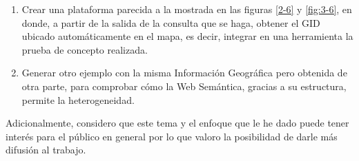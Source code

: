 \begin{enumerate}
	
	\item Crear una plataforma parecida a la mostrada en las figuras \ref{2-6} y \ref{fig:3-6}, en donde, a partir de la salida de la consulta que se haga, obtener el GID ubicado automáticamente en el mapa, es decir, integrar en una herramienta la prueba de concepto realizada.
	
	\item Generar otro ejemplo con la misma Información Geográfica pero obtenida de otra parte, para comprobar cómo la Web Semántica, gracias a su estructura, permite la heterogeneidad.
	
\end{enumerate}

Adicionalmente, considero que este tema y el enfoque que le he dado puede tener interés para el público en general por lo que valoro la posibilidad de darle más difusión al trabajo.



